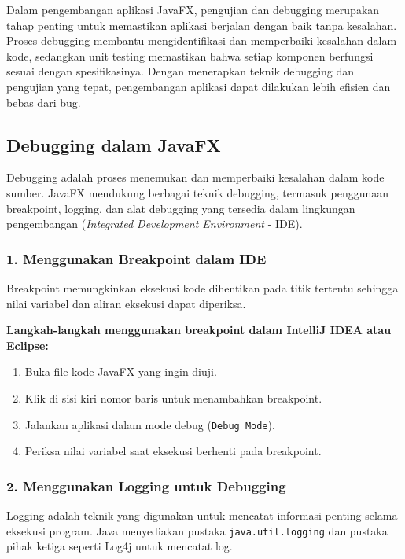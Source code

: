 Dalam pengembangan aplikasi JavaFX, pengujian dan debugging merupakan tahap penting untuk memastikan aplikasi berjalan dengan baik tanpa kesalahan. Proses debugging membantu mengidentifikasi dan memperbaiki kesalahan dalam kode, sedangkan unit testing memastikan bahwa setiap komponen berfungsi sesuai dengan spesifikasinya. Dengan menerapkan teknik debugging dan pengujian yang tepat, pengembangan aplikasi dapat dilakukan lebih efisien dan bebas dari bug.

\subsection{Debugging dalam JavaFX}

Debugging adalah proses menemukan dan memperbaiki kesalahan dalam kode sumber. JavaFX mendukung berbagai teknik debugging, termasuk penggunaan breakpoint, logging, dan alat debugging yang tersedia dalam lingkungan pengembangan (\textit{Integrated Development Environment} - IDE).

\subsubsection{1. Menggunakan Breakpoint dalam IDE}

Breakpoint memungkinkan eksekusi kode dihentikan pada titik tertentu sehingga nilai variabel dan aliran eksekusi dapat diperiksa.

\textbf{Langkah-langkah menggunakan breakpoint dalam IntelliJ IDEA atau Eclipse:}
\begin{enumerate}
	\item Buka file kode JavaFX yang ingin diuji.
	\item Klik di sisi kiri nomor baris untuk menambahkan breakpoint.
	\item Jalankan aplikasi dalam mode debug (\texttt{Debug Mode}).
	\item Periksa nilai variabel saat eksekusi berhenti pada breakpoint.
\end{enumerate}

\subsubsection{2. Menggunakan Logging untuk Debugging}

Logging adalah teknik yang digunakan untuk mencatat informasi penting selama eksekusi program. Java menyediakan pustaka \texttt{java.util.logging} dan pustaka pihak ketiga seperti Log4j untuk mencatat log.

